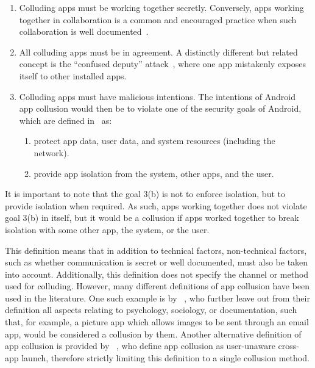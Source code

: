 \documentclass[article]{aaltoseries}
\begin{document}
\begin{enumerate}
	
	\item Colluding apps must be working together secretly. Conversely, apps working together in collaboration is a common and encouraged practice when such collaboration is well documented~\cite[\href{https://developer.android.com/training/basics/intents}{``Interacting with Other Apps''}]{AOSPdeveloper}.

	\item All colluding apps must be in agreement. A distinctly different but related concept is the ``confused deputy'' attack~\cite{Hardy1988}, where one app mistakenly exposes itself to other installed apps.

	\item Colluding apps must have malicious intentions. The intentions of Android app collusion would then be to violate one of the security goals of Android, which are defined in~\cite{AOSPsecurity} as:
	\begin{enumerate}[nosep]
		\item protect app data, user data, and system resources (including the network).
		\item provide app isolation from the system, other apps, and the user.
	\end{enumerate}
\end{enumerate}

It is important to note that the goal 3(b) is not to enforce isolation, but to provide isolation when required. As such, apps working together does not violate goal 3(b) in itself, but it would be a collusion if apps worked together to break isolation with some other app, the system, or the user.

This definition means that in addition to technical factors, non-technical factors, such as whether communication is secret or well documented, must also be taken into account. Additionally, this definition does not specify the channel or method used for colluding. However, many different definitions of app collusion have been used in the literature. One such example is by \citeauthor{Asavoae2017}~\cite{Asavoae2017}, who further leave out from their definition all aspects relating to psychology, sociology, or documentation, such that, for example, a picture app which allows images to be sent through an email app, would be considered a collusion by them. Another alternative definition of app collusion is provided by \citeauthor{Xu2017}~\cite{Xu2017}, who define app collusion as user-unaware cross-app launch, therefore strictly limiting this definition to a single collusion method.
\end{document}

